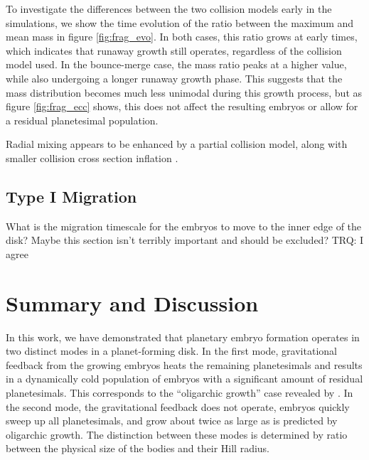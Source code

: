 \documentclass[twocolumn]{aastex63}
\begin{document}
To investigate the differences between the two collision models early in the simulations, we show the time evolution of the ratio between the maximum and mean mass in figure \ref{fig:frag_evo}. In both cases, this ratio grows at early times, which indicates that runaway growth still operates, regardless of the collision model used. In the bounce-merge case, the mass ratio peaks at a higher value, while also undergoing a longer runaway growth phase. This suggests that the mass distribution becomes much less unimodal during this growth process, but as figure \ref{fig:frag_ecc} shows, this does not affect the resulting embryos or allow for a residual planetesimal population.

Radial mixing appears to be enhanced by a partial collision model, along with smaller collision cross section inflation \citep{childs22}.


\subsection{Type I Migration}

What is the migration timescale for the embryos to move to the inner edge of the disk? Maybe this section isn't terribly important and should be excluded?
TRQ: I agree

\section{Summary and Discussion} \label{sec:discuss}

In this work, we have demonstrated that planetary embryo formation
operates in two distinct modes in a planet-forming disk. In the first
mode, gravitational feedback from the growing embryos heats the
remaining planetesimals and results in a dynamically cold population
of embryos with a significant amount of residual planetesimals. This
corresponds to the ``oligarchic growth'' case revealed by \citep{kokubo98}. In the second mode, the gravitational feedback does not operate, embryos quickly sweep up all planetesimals, and grow about twice as large as is predicted by oligarchic growth. The distinction between these modes is determined by ratio between the physical size of the bodies and their Hill radius. 
\end{document}
